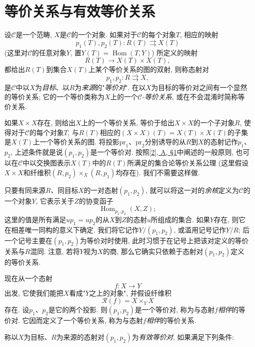 \chapter{等价关系与有效等价关系}\thispagestyle{fancy}\label{fga3.iii-1}
\par{}设\(\mathcal {C}\)是一个范畴, \(X\)是\(\mathcal {C}\)的一个对象. 如果对于\(\mathcal {C}\)的每个对象\(T\), 相应的映射\[     p_1(T),p_2(T)\colon  R(T)\rightrightarrows  X(T)   \] (这里对\(\mathcal {C}\)的任意对象\(Y\), 置\(Y(T)=\operatorname {Hom}(T,Y)\)) 所定义的映射\[     R(T)\to  X(T)\times  X(T),\] 都给出\(R(T)\)到集合\(X(T)\)上某个等价关系的图的双射, 则称态射对\[     p_1,p_2\colon  R\rightrightarrows  X,   \]是\(\mathcal {C}\)中以\(X\)为\emph{目标}、以\(R\)为\emph{来源}的"\emph{等价对}". 在以\(X\)为目标的等价对之间有一个显然的等价关系; 它的一个等价类称为\(X\)上的一个\emph{\(\mathcal {C}\)-等价关系}, 或在不会混淆时简称等价关系.
\par{}如果\(X\times  X\)存在, 则给出\(X\)上的一个等价关系, 等价于给出\(X\times  X\)的一个子对象\(R\), 使得对于\(\mathcal {C}\)的每个对象\(T\), 与\(R(T)\)相应的\((X\times  X)(T)=X(T)\times  X(T)\)的子集是\(X(T)\)上一个等价关系的图. 将投影\(\mathrm {pr}_1\)、\(\mathrm {pr}_2\)分别诱导的从\(R\)到\(X\)的态射记作\(p_1\)、\(p_2\), 上述条件就是说\((p_1,p_2)\)是一个等价对. 按照\hyperref[fga3.ii-a.1]{[2], A, §1}中阐述的一般原则, 也可以在\(\mathcal {C}\)中以交换图表示\(X(T)\)中的\(R(T)\)所满足的集合论等价关系公理 (这里假设\(X\times  X\)和纤维积\((R,p_2)\times _X(R,p_1)\)均存在). 我们不需要这样做.
\par{}只要有同来源\(R\)、同目标\(X\)的一对态射\((p_1,p_2)\), 就可以将这一对的\emph{余核}定义为\(\mathcal {C}\)的一个对象\(Y\), 它表示关于\(Z\)的协变函子\[     \operatorname {Hom}_{p_1,p_2}(X,Z);\] 这里的值是所有满足\(up_1=up_2\)的从\(X\)到\(Z\)的态射\(u\)所组成的集合. 如果\(Y\)存在, 则它在相差唯一同构的意义下确定. 我们将它记作\(Y/(p_1,p_2)\), 或滥用记号记作\(Y/R\); 后一个记号主要在\((p_1,p_2)\)为等价对时使用, 此时习惯于在记号上把该对定义的等价关系与\(R\)混同. 注意, 若将\(Y\)视为\(X\)的商, 那么它确实只依赖于态射对\((p_1,p_2)\)定义的等价关系.
\par{}现在从一个态射\[     f\colon  X\to  Y   \]出发, 它使我们能把\(X\)看成"\(Y\)之上的对象", 并假设纤维积\[     \mathcal {R}(f)     = X\times _Y X   \]存在. 设\(p_1\)、\(p_2\)是它的两个投影. 则\((p_1,p_2)\)是一个等价对, 称为与态射\(f\)\emph{相伴}的等价对. 它因而定义了一个等价关系, 称为与态射\(f\)\emph{相伴}的等价关系.
\par{}称以\(X\)为目标、\(R\)为来源的态射对\((p_1,p_2)\)为\emph{有效等价对}, 如果满足下列条件: 

